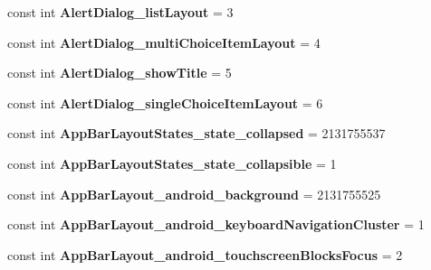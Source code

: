 \begin{DoxyCompactItemize}
const int {\bfseries Alert\+Dialog\+\_\+list\+Layout} = 3
\item 
\mbox{\label{classst_delivery_1_1_resource_1_1_styleable_a220b1e30f1c45db44b886cf710cb8c90}} 
const int {\bfseries Alert\+Dialog\+\_\+multi\+Choice\+Item\+Layout} = 4
\item 
\mbox{\label{classst_delivery_1_1_resource_1_1_styleable_adce10ba939244db3ed7063d6eb232d3b}} 
const int {\bfseries Alert\+Dialog\+\_\+show\+Title} = 5
\item 
\mbox{\label{classst_delivery_1_1_resource_1_1_styleable_a153a33a5fb0b976f4d7622433b8193aa}} 
const int {\bfseries Alert\+Dialog\+\_\+single\+Choice\+Item\+Layout} = 6
\item 
\mbox{\label{classst_delivery_1_1_resource_1_1_styleable_a94532cabab5526d4cbfddbbec7709726}} 
const int {\bfseries App\+Bar\+Layout\+States\+\_\+state\+\_\+collapsed} = 2131755537
\item 
\mbox{\label{classst_delivery_1_1_resource_1_1_styleable_ab96798022afd921953da30d78e23e17f}} 
const int {\bfseries App\+Bar\+Layout\+States\+\_\+state\+\_\+collapsible} = 1
\item 
\mbox{\label{classst_delivery_1_1_resource_1_1_styleable_af9661b247843a8c4fee34dd95ad19536}} 
const int {\bfseries App\+Bar\+Layout\+\_\+android\+\_\+background} = 2131755525
\item 
\mbox{\label{classst_delivery_1_1_resource_1_1_styleable_a3792b6baf5bfc3bdd38c05b61e1d0b85}} 
const int {\bfseries App\+Bar\+Layout\+\_\+android\+\_\+keyboard\+Navigation\+Cluster} = 1
\item 
\mbox{\label{classst_delivery_1_1_resource_1_1_styleable_a30bbe7c50cac9de5ab911eee813cff9d}} 
const int {\bfseries App\+Bar\+Layout\+\_\+android\+\_\+touchscreen\+Blocks\+Focus} = 2
\item 
\mbox{\label{classst_delivery_1_1_resource_1_1_styleable_a70278e6c2ff798a9ec3366c7e4989ae6}} 

\end{DoxyCompactItemize}
